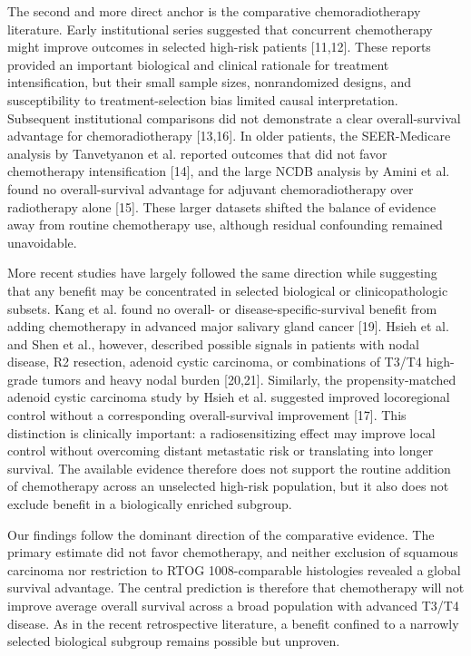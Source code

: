 \documentclass[9pt,twocolumn]{extarticle}
\begin{document}
The second and more direct anchor is the comparative chemoradiotherapy literature. Early institutional series suggested that concurrent chemotherapy might improve outcomes in selected high-risk patients [11,12]. These reports provided an important biological and clinical rationale for treatment intensification, but their small sample sizes, nonrandomized designs, and susceptibility to treatment-selection bias limited causal interpretation. Subsequent institutional comparisons did not demonstrate a clear overall-survival advantage for chemoradiotherapy [13,16]. In older patients, the SEER-Medicare analysis by Tanvetyanon et al. reported outcomes that did not favor chemotherapy intensification [14], and the large NCDB analysis by Amini et al. found no overall-survival advantage for adjuvant chemoradiotherapy over radiotherapy alone [15]. These larger datasets shifted the balance of evidence away from routine chemotherapy use, although residual confounding remained unavoidable.\par
More recent studies have largely followed the same direction while suggesting that any benefit may be concentrated in selected biological or clinicopathologic subsets. Kang et al. found no overall- or disease-specific-survival benefit from adding chemotherapy in advanced major salivary gland cancer [19]. Hsieh et al. and Shen et al., however, described possible signals in patients with nodal disease, R2 resection, adenoid cystic carcinoma, or combinations of T3/T4 high-grade tumors and heavy nodal burden [20,21]. Similarly, the propensity-matched adenoid cystic carcinoma study by Hsieh et al. suggested improved locoregional control without a corresponding overall-survival improvement [17]. This distinction is clinically important: a radiosensitizing effect may improve local control without overcoming distant metastatic risk or translating into longer survival. The available evidence therefore does not support the routine addition of chemotherapy across an unselected high-risk population, but it also does not exclude benefit in a biologically enriched subgroup.\par
Our findings follow the dominant direction of the comparative evidence. The primary estimate did not favor chemotherapy, and neither exclusion of squamous carcinoma nor restriction to RTOG 1008-comparable histologies revealed a global survival advantage. The central prediction is therefore that chemotherapy will not improve average overall survival across a broad population with advanced T3/T4 disease. As in the recent retrospective literature, a benefit confined to a narrowly selected biological subgroup remains possible but unproven.\par
\end{document}

